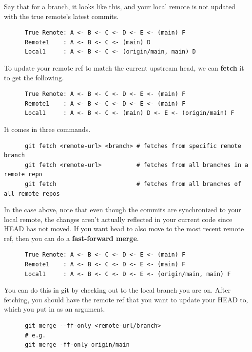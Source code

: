   \begin{definition}[Fetch] 
    Say that for a branch, it looks like this, and your local remote is not updated with the true remote's latest commits. 
    \begin{lstlisting}
      True Remote: A <- B <- C <- D <- E <- (main) F
      Remote1    : A <- B <- C <- (main) D 
      Local1     : A <- B <- C <- (origin/main, main) D
    \end{lstlisting}
    To update your remote ref to match the current upstream head, we can \textbf{fetch} it to get the following. 
    \begin{lstlisting}
      True Remote: A <- B <- C <- D <- E <- (main) F
      Remote1    : A <- B <- C <- D <- E <- (main) F
      Local1     : A <- B <- C <- (main) D <- E <- (origin/main) F
    \end{lstlisting}
    It comes in three commands. 
    \begin{lstlisting}
      git fetch <remote-url> <branch> # fetches from specific remote branch 
      git fetch <remote-url>          # fetches from all branches in a remote repo  
      git fetch                       # fetches from all branches of all remote repos
    \end{lstlisting}
  \end{definition}

  \begin{definition}
    In the case above, note that even though the commits are synchronized to your local remote, the changes aren't actually reflected in your current code since HEAD has not moved. If you want head to also move to the most recent remote ref, then you can do a \textbf{fast-forward merge}. 
    \begin{lstlisting}
      True Remote: A <- B <- C <- D <- E <- (main) F
      Remote1    : A <- B <- C <- D <- E <- (main) F
      Local1     : A <- B <- C <- D <- E <- (origin/main, main) F
    \end{lstlisting}
    You can do this in git by checking out to the local branch you are on. After fetching, you should have the remote ref that you want to update your HEAD to, which you put in as an argument. 
    \begin{lstlisting}
      git merge --ff-only <remote-url/branch> 
      # e.g. 
      git merge -ff-only origin/main 
    \end{lstlisting}
  \end{definition}

